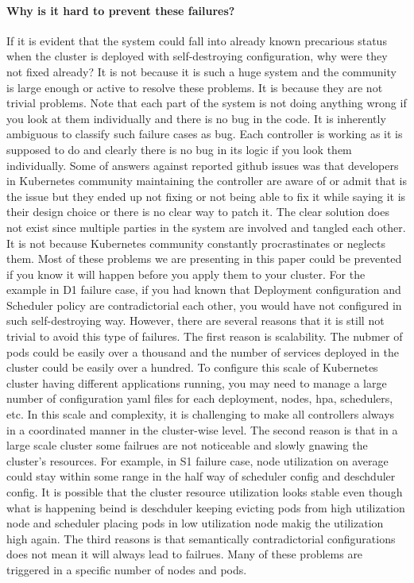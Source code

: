 \paragraph*{Why is it hard to prevent these failures?}
If it is evident that the system could fall into already known precarious status when the cluster is deployed with self-destroying configuration, why were they not fixed already? It is not because it is such a huge system and the community is large enough or active to resolve these problems. It is because they are not trivial problems. Note that each part of the system is not doing anything wrong if you look at them individually and there is no bug in the code.
It is inherently ambiguous to classify such failure cases as bug. Each controller is working as it is supposed to do and clearly there is no bug in its logic if you look them individually. Some of answers against reported github issues was that developers in Kubernetes community maintaining the controller are aware of or admit that is the issue but they ended up not fixing or not being able to fix it while saying it is their design choice or there is no clear way to patch it. The clear solution does not exist since multiple parties in the system are involved and tangled each other. It is not because Kubernetes community constantly procrastinates or neglects them. 
Most of these problems we are presenting in this paper could be prevented if you know it will happen before you apply them to your cluster. For the example in D1 failure case, if you had known that Deployment configuration and Scheduler policy are contradictorial each other, you would have not configured in such self-destroying way. However, there are several reasons that it is still not trivial to avoid this type of failures. The first reason is scalability. The nubmer of pods could be easily over a thousand and the number of services deployed in the cluster could be easily over a hundred. To configure this scale of Kubernetes cluster having different applications running, you may need to manage a large number of configuration yaml files for each deployment, nodes, hpa, schedulers, etc. In this scale and complexity, it is challenging to make all controllers always in a coordinated manner in the cluster-wise level. The second reason is that in a large scale cluster some failrues are not noticeable and slowly gnawing the cluster's resources. For example, in S1 failure case, node utilization on average could stay within some range in the half way of scheduler config and deschduler config. It is possible that the cluster resource utilization looks stable even though what is happening beind is deschduler keeping evicting pods from high utilization node and scheduler placing pods in low utilization node makig the utilization high again. The third reasons is that semantically contradictorial configurations does not mean it will always lead to failrues. Many of these problems are triggered in a specific number of nodes and pods. 

